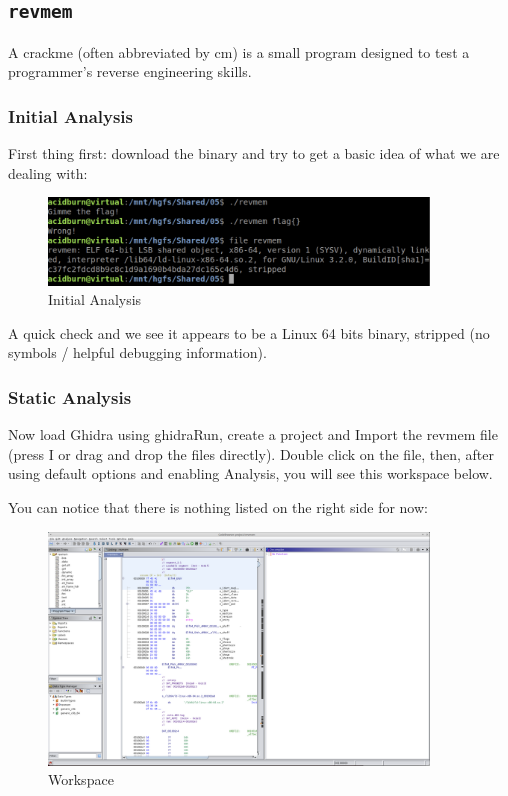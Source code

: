 \documentclass{article}
\begin{document}
\subsection{\texttt{revmem}}

A crackme (often abbreviated by cm) is a small program designed to test a programmer’s 
reverse engineering skills. 

\subsubsection{Initial Analysis}

First thing first: download the binary and try to get a basic idea of what we are dealing with:
\begin{figure}[H]
\centering
\includegraphics[width=0.9\textwidth]{img/initial.jpg}
\caption{Initial Analysis}
\label{fig:initial}
\end{figure}
\noindent\linebreak
A quick check and we see it appears to be a Linux 64 bits binary, stripped (no symbols / helpful debugging information).

\subsubsection{Static Analysis}

\noindent\linebreak
Now load Ghidra using ghidraRun, create a project and Import the revmem file (press I or drag and drop the files 
directly). Double click on the file, then, after using default options and enabling Analysis, you will see this 
workspace below.

\noindent\linebreak
You can notice that there is nothing listed on the right side for now:
\begin{figure}[H]
\centering
\includegraphics[width=0.9\textwidth]{img/ghidra_1.jpg}
\caption{Workspace}
\label{fig:ghidra_1}
\end{figure}
\end{document}
